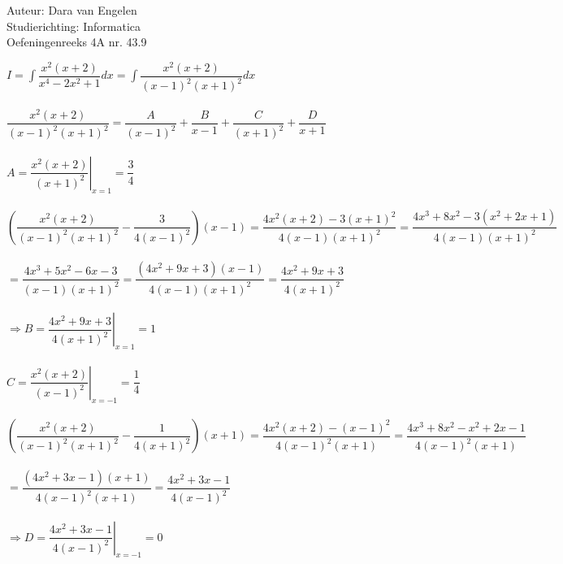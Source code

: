 \documentclass[a4paper]{article}
\begin{document}
  
\noindent \large Auteur: Dara van Engelen \\
\noindent \large Studierichting: Informatica\\
\noindent \large Oefeningenreeks 4A nr. 43.9\\

\medskip

\normalsize

$ I = \displaystyle\int \dfrac{x^2(x+2)}{x^4-2x^2+1}dx =  \displaystyle\int \dfrac{x^2(x+2)}{(x-1)^2(x+1)^2}dx $\\\\

$\dfrac{x^2(x+2)}{(x-1)^2(x+1)^2} = \dfrac{A}{(x-1)^2} + \dfrac{B}{x-1} + \dfrac{C}{(x+1)^2} + \dfrac{D}{x+1}$\\\\

$A  =\left. \dfrac{x^2(x+2)}{(x+1)^2} \right|_{x=1} = \dfrac{3}{4}$\\\\

$\left( \dfrac{x^2(x+2)}{(x-1)^2(x+1)^2} - \dfrac{3}{4(x-1)^2}  \right)(x-1) = \dfrac{4x^2(x+2)-3(x+1)^2}{4(x-1)(x+1)^2} = \dfrac{4x^3+8x^2-3(x^2+2x+1)}{4(x-1)(x+1)^2}$\\\\

$ = \dfrac{4x^3+5x^2-6x-3}{(x-1)(x+1)^2} = \dfrac{(4x^2+9x+3)(x-1)}{4(x-1)(x+1)^2} = \dfrac{4x^2+9x+3}{4(x+1)^2}$\\\\

$\Rightarrow B = \left. \dfrac{4x^2+9x+3}{4(x+1)^2} \right|_{x=1} = 1$\\\\

$C = \left. \dfrac{x^2(x+2)}{(x-1)^2}\right|_{x=-1} = \dfrac{1}{4}$\\\\

$\left( \dfrac{x^2(x+2)}{(x-1)^2(x+1)^2} -\dfrac{1}{4(x+1)^2}\right)(x+1) = \dfrac{4x^2(x+2)-(x-1)^2}{4(x-1)^2(x+1)} = \dfrac{4x^3 + 8x^2 -x^2+2x-1}{4(x-1)^2(x+1)}$\\\\

$ = \dfrac{(4x^2+3x-1)(x+1)}{4(x-1)^2(x+1)} = \dfrac{4x^2+3x-1}{4(x-1)^2}$\\\\

$\Rightarrow D = \left. \dfrac{4x^2 + 3x-1}{4(x-1)^2}\right|_{x=-1} = 0$\\\\
\end{document}
